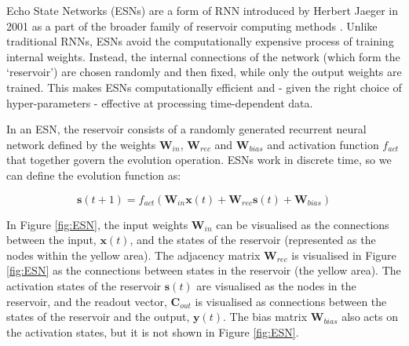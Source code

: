 \documentclass[a4paper,12pt]{article}
\begin{document}
Echo State Networks (ESNs) are a form of RNN introduced by Herbert Jaeger in 2001 as a part of the broader family of reservoir computing methods \cite{jaeger2001echo}. Unlike traditional RNNs, ESNs avoid the computationally expensive process of training internal weights. Instead, the internal connections of the network (which form the `reservoir') are chosen randomly and then fixed, while only the output weights are trained. This makes ESNs computationally efficient and - given the right choice of hyper-parameters - effective at processing time-dependent data.

In an ESN, the reservoir consists of a randomly generated recurrent neural network defined by the weights $\mathbf{W}_{in}$, $\mathbf{W}_{rec}$ and $\mathbf{W}_{bias}$ and activation function $f_{act}$ that together govern the evolution operation. ESNs work in discrete time, so we can define the evolution function as:

\begin{equation*}
\mathbf{s}(t + 1) = f_{act}(\mathbf{W}_{in}\mathbf{x}(t) + \mathbf{W}_{rec}\mathbf{s}(t) + \mathbf{W}_{bias})
\end{equation*}

In Figure \ref{fig:ESN}, the input weights $\mathbf{W}_{in}$ can be visualised as the connections between the input, $\mathbf{x}(t)$, and the states of the reservoir (represented as the nodes within the yellow area). The adjacency matrix $\mathbf{W}_{rec}$ is visualised in Figure \ref{fig:ESN} as the connections between states in the reservoir (the yellow area). The activation states of the reservoir $\mathbf{s}(t)$ are visualised as the nodes in the reservoir, and the readout vector, $\mathbf{C}_{out}$ is visualised as connections between the states of the reservoir and the output, $\mathbf{y}(t)$. The bias matrix $\mathbf{W}_{bias}$ also acts on the activation states, but it is not shown in Figure \ref{fig:ESN}.
\end{document}
